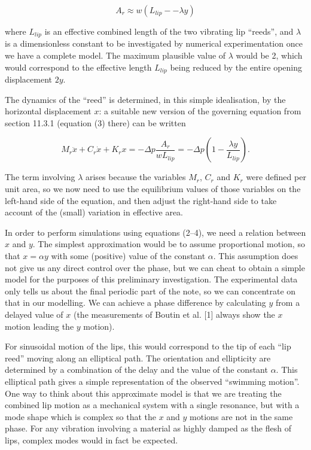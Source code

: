   $$A_r \approx w (L_{lip} -- \lambda y) \tag{3}$$ 

  where $L_{lip}$ is an effective combined length of the two vibrating lip 
  ``reeds'', and $\lambda$ is a dimensionless constant to be investigated by 
  numerical experimentation once we have a complete model. The maximum 
  plausible value of $\lambda$ would be 2, which would correspond to the 
  effective length $L_{lip}$ being reduced by the entire opening displacement 
  $2y$. 

  The dynamics of the ``reed'' is determined, in this simple idealisation, by 
  the horizontal displacement $x$: a suitable new version of the governing 
  equation from section 11.3.1 (equation (3) there) can be written 

  $$M_r \ddot{x} + C_r \dot{x} + K_r x=-\Delta p \dfrac{A_r}{w L_{lip}}=-\Delta 
  p \left(1-\dfrac{\lambda y}{L_{lip}}\right) . \tag{4}$$ 

  The term involving $\lambda$ arises because the variables $M_r$, $C_r$ and 
  $K_r$ were defined per unit area, so we now need to use the equilibrium 
  values of those variables on the left-hand side of the equation, and then 
  adjust the right-hand side to take account of the (small) variation in 
  effective area. 

  In order to perform simulations using equations (2--4), we need a relation 
  between $x$ and $y$. The simplest approximation would be to assume 
  proportional motion, so that $x=\alpha y$ with some (positive) value of the 
  constant $\alpha$. This assumption does not give us any direct control over 
  the phase, but we can cheat to obtain a simple model for the purposes of this 
  preliminary investigation. The experimental data only tells us about the 
  final periodic part of the note, so we can concentrate on that in our 
  modelling. We can achieve a phase difference by calculating $y$ from a 
  delayed value of $x$ (the measurements of Boutin et al. [1] always show the 
  $x$ motion leading the $y$ motion). 

  For sinusoidal motion of the lips, this would correspond to the tip of each 
  ``lip reed'' moving along an elliptical path. The orientation and ellipticity 
  are determined by a combination of the delay and the value of the constant 
  $\alpha$. This elliptical path gives a simple representation of the observed 
  ``swimming motion''. One way to think about this approximate model is that we 
  are treating the combined lip motion as a mechanical system with a single 
  resonance, but with a mode shape which is complex so that the $x$ and $y$ 
  motions are not in the same phase. For any vibration involving a material as 
  highly damped as the flesh of lips, complex modes would in fact be expected. 

